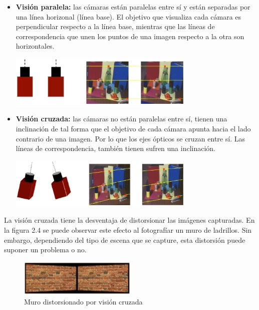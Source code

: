 \begin{itemize}
  \item \textbf{Visión paralela:} las cámaras están paralelas entre sí y están
  separadas por una línea horizonal (línea base). El objetivo que visualiza
  cada cámara es perpendicular respecto a la línea base, mientras que las
  líneas de correspondencia que unen los puntos de una imagen respecto a la otra
  son horizontales.

  \begin{minipage}{\linewidth}
      \centering
      \includegraphics[width=0.7\textwidth]{images/cap2/VisionParalela.eps}
      \label{fig:VisionParalela}
  \end{minipage}

  \item \textbf{Visión cruzada:} las cámaras no están paralelas entre sí, tienen
  una inclinación de tal forma que el objetivo de cada cámara apunta hacia el
  lado contrario de una imagen. Por lo que los ejes ópticos se cruzan entre sí.
  Las líneas de correspondencia, también tienen sufren una inclinación.

  \begin{minipage}{\linewidth}
      \centering
      \includegraphics[width=0.7\textwidth]{images/cap2/VisionCruzada.eps}
      \label{fig:VisionCruzada}
  \end{minipage}
\end{itemize}

La visión cruzada tiene la desventaja de distorsionar las imágenes capturadas.
En la figura 2.4 se puede observar este efecto al fotografíar un muro de
ladrillos. Sin embargo, dependiendo del tipo de escena que se capture, esta
distorsión puede suponer un problema o no.

\begin{figure}[!th]
  \begin{center}
    \includegraphics[width=0.5\textwidth]{images/cap2/VisionCruzadaMuro.eps}
    \caption{Muro distorsionado por visión cruzada}
    \label{fig:VisionCruzadaMuro}
  \end{center}
\end{figure}

